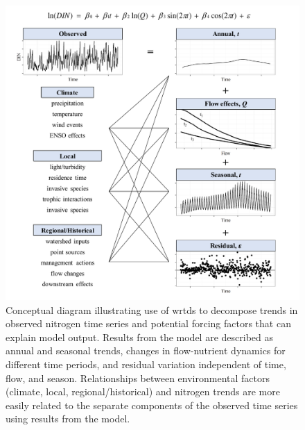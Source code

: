 \documentclass[letterpaper,12pt,oneside]{article}\usepackage[]{graphicx}\usepackage[]{color}
\begin{document}
\begin{figure}
\centering
\includegraphics[width=1\textwidth,page=1]{figs/schematic.pdf}
\caption{Conceptual diagram illustrating use of \ac{wrtds} to decompose trends in observed nitrogen time series and potential forcing factors that can explain model output.  Results from the model are described as annual and seasonal trends, changes in flow-nutrient dynamics for different time periods, and residual variation independent of time, flow, and season. Relationships between environmental factors (climate, local, regional/historical) and nitrogen trends are more easily related to the separate components of the observed time series using results from the model. }
\label{fig:schematic}   
\end{figure}
\end{document}
